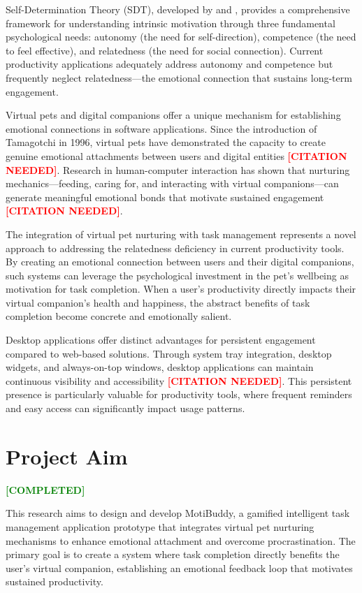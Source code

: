 \documentclass[12pt,a4paper]{report}
\newcommand{\completed}{\textcolor{green}{\textbf{[COMPLETED]}}}
\newcommand{\citationneeded}{\textcolor{red}{\textbf{[CITATION NEEDED]}}}
\begin{document}
Self-Determination Theory (SDT), developed by \citet{deci2000amotivation} and \citet{ryan2017self}, provides a comprehensive framework for understanding intrinsic motivation through three fundamental psychological needs: autonomy (the need for self-direction), competence (the need to feel effective), and relatedness (the need for social connection). Current productivity applications adequately address autonomy and competence but frequently neglect relatedness---the emotional connection that sustains long-term engagement.

Virtual pets and digital companions offer a unique mechanism for establishing emotional connections in software applications. Since the introduction of Tamagotchi in 1996, virtual pets have demonstrated the capacity to create genuine emotional attachments between users and digital entities \citationneeded. Research in human-computer interaction has shown that nurturing mechanics---feeding, caring for, and interacting with virtual companions---can generate meaningful emotional bonds that motivate sustained engagement \citationneeded.

The integration of virtual pet nurturing with task management represents a novel approach to addressing the relatedness deficiency in current productivity tools. By creating an emotional connection between users and their digital companions, such systems can leverage the psychological investment in the pet's wellbeing as motivation for task completion. When a user's productivity directly impacts their virtual companion's health and happiness, the abstract benefits of task completion become concrete and emotionally salient.

Desktop applications offer distinct advantages for persistent engagement compared to web-based solutions. Through system tray integration, desktop widgets, and always-on-top windows, desktop applications can maintain continuous visibility and accessibility \citationneeded. This persistent presence is particularly valuable for productivity tools, where frequent reminders and easy access can significantly impact usage patterns.

\section{Project Aim}
\label{sec:aim}

\completed

This research aims to design and develop MotiBuddy, a gamified intelligent task management application prototype that integrates virtual pet nurturing mechanisms to enhance emotional attachment and overcome procrastination. The primary goal is to create a system where task completion directly benefits the user's virtual companion, establishing an emotional feedback loop that motivates sustained productivity.
\end{document}

